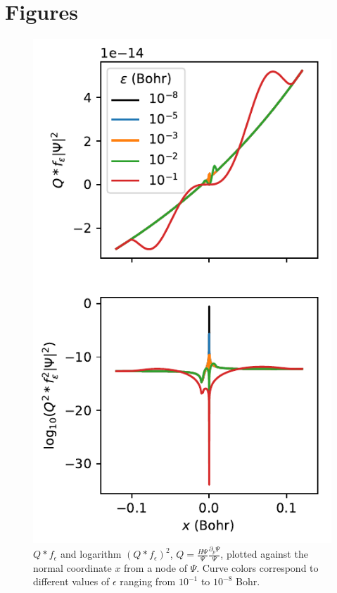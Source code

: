 \documentclass{article}
\begin{document}
\section{Figures}
\begin{figure}
\centering
\includegraphics{../plots/viznode.pdf}
\caption{$Q * f_\epsilon$ and logarithm $(Q * f_\epsilon)^2$, $Q = \frac{H\Psi}{\Psi}\frac{\partial_p \Psi}{\Psi}$,  plotted against the normal coordinate $x$ from a node of $\Psi$. Curve colors correspond to different values of $\epsilon$ ranging from $10^{-1}$ to $10^{-8}$ Bohr.}
\end{figure}
\end{document}
